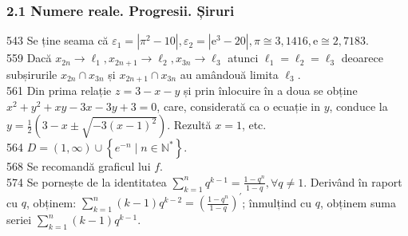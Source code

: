 \documentclass[11pt]{article}
\begin{document}
\subsubsection*{2.1 Numere reale. Progresii. Șiruri}
543 Se ține seama că $\varepsilon_{1}=\left|\pi^{2}-10\right|, \varepsilon_{2}=\left|\mathrm{e}^{3}-20\right|, \pi \cong 3,1416, \mathrm{e} \cong 2,7183$.\\
559 Dacă $x_{2 n} \rightarrow \ell_{1}, x_{2 n+1} \rightarrow \ell_{2}, x_{3 n} \rightarrow \ell_{3}$ atunci $\ell_{1}=\ell_{2}=\ell_{3}$ deoarece subșirurile $x_{2 n} \cap x_{3 n}$ și $x_{2 n+1} \cap x_{3 n}$ au amândouă limita $\ell_{3}$.\\
561 Din prima relație $z=3-x-y$ și prin înlocuire în a doua se obține $x^{2}+y^{2}+x y-3 x-3 y+3=0$, care, considerată ca o ecuație in $y$, conduce la $y = \frac{1}{2} \left(3 - x \pm \sqrt{-3(x-1)^{2}}\right)$. Rezultă $x=1$, etc.\\
564 $D=(1, \infty) \cup\left\{e^{-n} \mid n \in \mathbb{N}^{*}\right\}$.\\
568 Se recomandă graficul lui $f$.\\
574 Se pornește de la identitatea $\sum_{k=1}^{n} q^{k-1}=\frac{1-q^{n}}{1-q}, \forall q \neq 1$. Derivând în raport cu $q$, obținem: $\sum_{k=1}^{n}(k-1) q^{k-2}=\left(\frac{1-q^{n}}{1-q}\right)^{\prime}$; înmulțind cu $q$, obținem suma seriei $\sum_{k=1}^{n}(k-1) q^{k-1}$.\\
\end{document}
